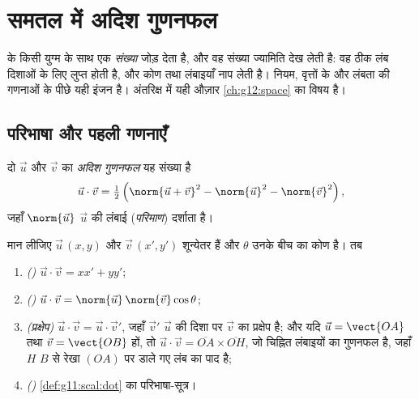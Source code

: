 \chapter{समतल में अदिश गुणनफल}\label{ch:g11:scal}

  के किसी युग्म के साथ एक \emph{संख्या} जोड़ देता है, और वह
संख्या ज्यामिति देख लेती है: वह ठीक लंब दिशाओं के लिए लुप्त होती है, और कोण
तथा लंबाइयाँ नाप लेती है।  नियम, वृत्तों के  और लंबता की गणनाओं
के पीछे यही इंजन है। अंतरिक्ष में यही औज़ार \cref{ch:g12:space} का विषय है।

\section{परिभाषा और पहली गणनाएँ}

\begin{definition}[अदिश गुणनफल]\label{def:g11:scal:dot}
दो  $\vec u$ और $\vec v$ का \emph{अदिश गुणनफल} यह संख्या है
\[
\vec u \cdot \vec v
= \tfrac12\left(\norm{\vec u + \vec v}^2 - \norm{\vec u}^2
- \norm{\vec v}^2\right),
\]
जहाँ $\norm{\vec u}$ $\vec u$ की लंबाई (\emph{परिमाण}) दर्शाता है।
\end{definition}

\begin{theorem}[अदिश गुणनफल के चार चेहरे]\label{thm:g11:scal:faces}
मान लीजिए $\vec u\,(x, y)$ और $\vec v\,(x', y')$ शून्येतर  हैं और $\theta$ उनके बीच का कोण है। तब
\begin{enumerate}
  \item \emph{()} $\vec u \cdot \vec v = xx' + yy'$;
  \item \emph{()} $\vec u \cdot \vec v =
        \norm{\vec u}\,\norm{\vec v}\cos\theta$;
  \item \emph{(प्रक्षेप)} $\vec u \cdot \vec v = \vec u \cdot \vec v'$, जहाँ $\vec v'$ $\vec u$ की दिशा पर $\vec v$ का 
        प्रक्षेप है; और यदि $\vec u = \vect{OA}$ तथा $\vec v = \vect{OB}$ हों, तो $\vec u \cdot \vec v = \overline{OA} \times \overline{OH}$, जो चिह्नित
        लंबाइयों का गुणनफल है, जहाँ $H$ $B$ से रेखा $(OA)$ पर डाले गए लंब
        का पाद है;
  \item \emph{()} \cref{def:g11:scal:dot} का परिभाषा-सूत्र।
\end{enumerate}
\end{theorem}

